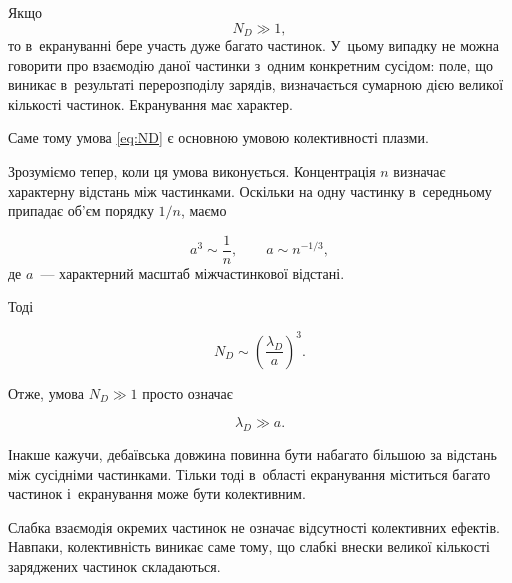 Якщо
\begin{equation}
    N_D\gg1,
\end{equation}
то в~екрануванні бере участь дуже багато частинок. У~цьому випадку не можна говорити про
взаємодію даної частинки з~одним конкретним сусідом: поле, що виникає в~результаті
перерозподілу зарядів, визначається сумарною дією великої кількості частинок. Екранування
має  характер.

Саме тому умова \eqref{eq:ND} є основною умовою колективності плазми.

Зрозуміємо тепер, коли ця умова виконується. Концентрація $n$ визначає характерну відстань
між частинками. Оскільки на одну частинку в~середньому припадає об'єм порядку $1/n$, маємо

\begin{equation*}
    a^3\sim\frac{1}{n},
    \qquad
    a\sim n^{-1/3},
\end{equation*}
де $a$~--- характерний масштаб міжчастинкової відстані.

Тоді

\begin{equation*}
    N_D\sim\left(\frac{\lambda_D}{a}\right)^3.
\end{equation*}

Отже, умова $N_D\gg1$ просто означає

\begin{equation*}
    \lambda_D\gg a.
\end{equation*}

Інакше кажучи, дебаївська довжина повинна бути набагато більшою за відстань між сусідніми
частинками. Тільки тоді в~області екранування міститься багато частинок і~екранування може
бути колективним.

\begin{Attention}
    Слабка взаємодія окремих частинок не означає відсутності колективних ефектів. Навпаки,
    колективність виникає саме тому, що слабкі внески великої кількості заряджених
    частинок складаються.
\end{Attention}



